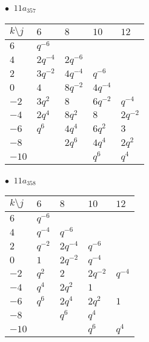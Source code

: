 \begin{minipage}{\linewidth}
$\bullet\ $ $11a_{357}$ \vspace{0.5em} \\
\begin{tabular}{l|llll}
$k \setminus j$ & $6$ & $8$ & $10$ & $12$ \\
\hline
$6$ & $q^{-6}$ &  &  &  \\
$4$ & $2q^{-4}$ & $2q^{-6}$ &  &  \\
$2$ & $3q^{-2}$ & $4q^{-4}$ & $q^{-6}$ &  \\
$0$ & $4$ & $8q^{-2}$ & $4q^{-4}$ &  \\
$-2$ & $3q^{2}$ & $8$ & $6q^{-2}$ & $q^{-4}$ \\
$-4$ & $2q^{4}$ & $8q^{2}$ & $8$ & $2q^{-2}$ \\
$-6$ & $q^{6}$ & $4q^{4}$ & $6q^{2}$ & $3$ \\
$-8$ &  & $2q^{6}$ & $4q^{4}$ & $2q^{2}$ \\
$-10$ &  &  & $q^{6}$ & $q^{4}$ \\
\end{tabular}
\vspace{2em}
\end{minipage}
%
\begin{minipage}{\linewidth}
$\bullet\ $ $11a_{358}$ \vspace{0.5em} \\
\begin{tabular}{l|llll}
$k \setminus j$ & $6$ & $8$ & $10$ & $12$ \\
\hline
$6$ & $q^{-6}$ &  &  &  \\
$4$ & $q^{-4}$ & $q^{-6}$ &  &  \\
$2$ & $q^{-2}$ & $2q^{-4}$ & $q^{-6}$ &  \\
$0$ & $1$ & $2q^{-2}$ & $q^{-4}$ &  \\
$-2$ & $q^{2}$ & $2$ & $2q^{-2}$ & $q^{-4}$ \\
$-4$ & $q^{4}$ & $2q^{2}$ & $1$ &  \\
$-6$ & $q^{6}$ & $2q^{4}$ & $2q^{2}$ & $1$ \\
$-8$ &  & $q^{6}$ & $q^{4}$ &  \\
$-10$ &  &  & $q^{6}$ & $q^{4}$ \\
\end{tabular}
\vspace{2em}
\end{minipage}
%
